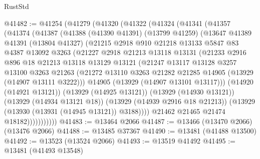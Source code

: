 \begin{lexlean}{RustStd}
\begin{coremodule}
@41482 := @41254
    (@41279
      (@41320
        (@41322
          (@41324
            (@41341
              (@41357
                (@41374
                  (@41387
                    (@41388
                      (@41390 @41391)
                      (@13799 @41259)
                      (@13647
                        @41389
                        @41391
                        (@13804 @41327)
                        (@21215
                          @2918
                          @910
                          @21218
                          @13133
                          @5847
                          @83
                          @4387
                          @13092
                          @3263
                          (@21227
                            @2918
                            @21213
                            @13118
                            @13131
                            (@21233
                              @2916
                              @896
                              @18
                              @21213
                              @13118
                              @13129
                              @13121
                              (@21247
                                @13117
                                @13128
                                @3257
                                @13100
                                @3263
                                @21263
                                (@21272
                                  @13110
                                  @3263
                                  @21282
                                  @21285
                                  @14905
                                  (@13929 (@14907 @13111 @3222)))
                                @14905
                                (@13929 (@14907 @13101 @13117)))
                              (@14920 (@14921 @13121))
                              (@13929 (@14925 @13121))
                              (@13929 (@14930 @13121))
                              (@13929 (@14934 @13121 @18))
                              (@13929 (@14939 @2916 @18 @21213))
                              (@13929 (@13930 (@13931 (@14945 @13121)) @3188))))
                          @21462
                          @21465
                          @21474
                          @18182)))))))))))
@41483 := @13464 @2066
@41487 := @13466 (@13470 @2066) (@13476 @2066)
@41488 := @13485 @37367
@41490 := @13481 (@41488 @13500)
@41492 := @13523 (@13524 @2066)
@41493 := @13519 @41492
@41495 := @13481 (@41493 @13548)

\end{coremodule}
\end{lexlean}
